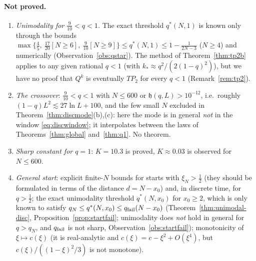 \documentclass[11pt,a4paper]{article}
\theoremstyle{definition}
\theoremstyle{remark}
\begin{document}
\paragraph{Not proved.}
\begin{enumerate}
\item \emph{Unimodality for $\frac9{10}<q<1$.} The exact threshold $q^*(N,1)$ is known only through the bounds
$\max\{\frac45,\ \frac{17}{20}[N\ge6],\ \frac9{10}[N\ge9]\}\le q^*(N,1)\le1-\frac1{2N-3}$ ($N\ge4$) and numerically
(Observation~\ref{obs:qstar}). The method of Theorem~\ref{thm:tp2b} applies to any given rational $q<1$ (with
$k_*\approx q^2/(2(1-q)^2)$), but we have no proof that $Q^k$ is eventually $TP_2$ for every $q<1$ (Remark~\ref{rem:tp2}).
\item \emph{The crossover}: $\frac9{10}<q<1$ with $N\le600$ or $\mathfrak h(q,L)>10^{-12}$, i.e.\ roughly
$(1-q)L^2\lesssim27\ln L+100$, and the few small $N$ excluded in Theorem~\ref{thm:discmode}(b),(c): here the mode is
in general \emph{not} in the window \eqref{eq:discwindow}; it
interpolates between the laws of Theorems~\ref{thm:global} and~\ref{thm:q1}. No theorem.
\item \emph{Sharp constant for $q=1$}: $K=10.3$ is proved, $K\approx0.03$ is observed for $N\le600$.
\item \emph{General start}: explicit finite-$N$ bounds for starts with $\xi_N>\frac12$ (they should be formulated in
terms of the distance $d=N-x_0$) and, in discrete time, for $q>\frac12$; the exact unimodality threshold $q^*(N,x_0)$ for
$x_0\ge2$, which is only known to satisfy $q_N\le q^*(N,x_0)\le q_{\rm fail}(N-x_0)$ (Theorem~\ref{thm:unimodal-disc},
Proposition~\ref{prop:startfail}; unimodality does \emph{not} hold in general for $q>q_N$, and $q_{\rm fail}$ is not sharp,
Observation~\ref{obs:startfail}); monotonicity of $\xi\mapsto c(\xi)$ (it is real-analytic and $c(\xi)=c-\xi^2+O(\xi^4)$,
but $c(\xi)/((1-\xi)^2/3)$ is not monotone).
\end{enumerate}
\end{document}
